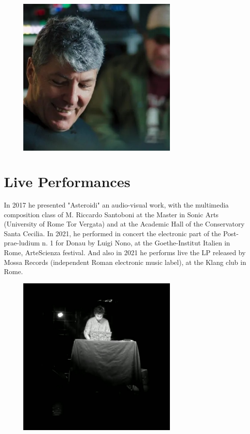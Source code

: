 \documentclass[12pt,landscape]{article}
\begin{document}
{\begin{center}
\begin{figure}[!htb]
\endminipage\hfill
{}%
  \includegraphics[width=8cm]{frommyscene.jpg}

\endminipage
\end{figure}

\clearpage


\section*{Live Performances}

In 2017 he presented "Asteroidi" an audio-visual work,
with the multimedia composition class of M. Riccardo Santoboni at the Master in Sonic Arts
(University of Rome Tor Vergata)
\newline
and at the Academic Hall of the Conservatory Santa Cecilia.
\newline
In 2021, he performed in concert the electronic part
of the Post-prae-ludium n. 1 for Donau by Luigi Nono,
at the Goethe-Institut Italien in Rome, ArteScienza festival.
\newline
And also in 2021 he performs live the LP released by Mossa Records
(independent Roman electronic music label),
at the Klang club in Rome.

\begin{figure}[!htb]
  \includegraphics[width=8cm]{live1.jpg}


\end{figure}
\end{center}}
\end{document}

